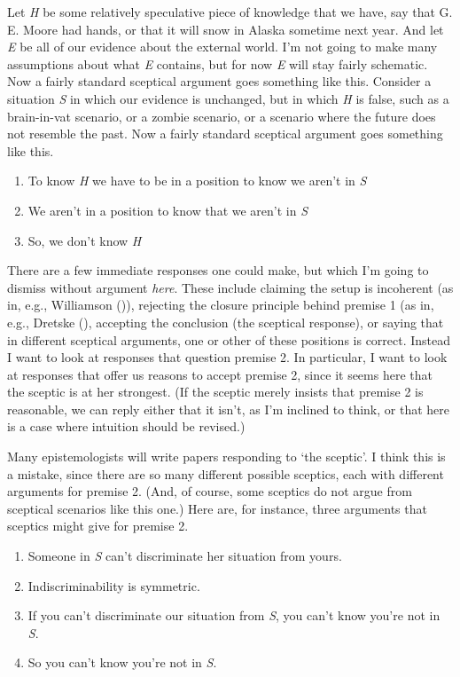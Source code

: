 \documentclass[
  11pt,
  letterpaper,
  DIV=11,
  numbers=noendperiod,
  oneside]{scrartcl}
\begin{document}
Let \emph{H} be some relatively speculative piece of knowledge that we
have, say that G. E. Moore had hands, or that it will snow in Alaska
sometime next year. And let \emph{E} be all of our evidence about the
external world. I'm not going to make many assumptions about what
\emph{E} contains, but for now \emph{E} will stay fairly schematic. Now
a fairly standard sceptical argument goes something like this. Consider
a situation \emph{S} in which our evidence is unchanged, but in which
\emph{H} is false, such as a brain-in-vat scenario, or a zombie
scenario, or a scenario where the future does not resemble the past. Now
a fairly standard sceptical argument goes something like this.

\begin{enumerate}
\def\labelenumi{\arabic{enumi}.}
\item
  To know \emph{H} we have to be in a position to know we aren't in
  \emph{S}
\item
  We aren't in a position to know that we aren't in \emph{S}
\item
  So, we don't know \emph{H}
\end{enumerate}

There are a few immediate responses one could make, but which I'm going
to dismiss without argument \emph{here}. These include claiming the
setup is incoherent (as in, e.g., Williamson
()), rejecting the closure
principle behind premise 1 (as in, e.g., Dretske
(), accepting the conclusion (the
sceptical response), or saying that in different sceptical arguments,
one or other of these positions is correct. Instead I want to look at
responses that question premise 2. In particular, I want to look at
responses that offer us reasons to accept premise 2, since it seems here
that the sceptic is at her strongest. (If the sceptic merely insists
that premise 2 is reasonable, we can reply either that it isn't, as I'm
inclined to think, or that here is a case where intuition should be
revised.)

Many epistemologists will write papers responding to `the sceptic'. I
think this is a mistake, since there are so many different possible
sceptics, each with different arguments for premise 2. (And, of course,
some sceptics do not argue from sceptical scenarios like this one.) Here
are, for instance, three arguments that sceptics might give for premise
2.

\begin{enumerate}
\def\labelenumi{\arabic{enumi}.}
\item
  Someone in \emph{S} can't discriminate her situation from yours.
\item
  Indiscriminability is symmetric.
\item
  If you can't discriminate our situation from \emph{S}, you can't know
  you're not in \emph{S}.
\item
  So you can't know you're not in \emph{S}.
\end{enumerate}
\end{document}
